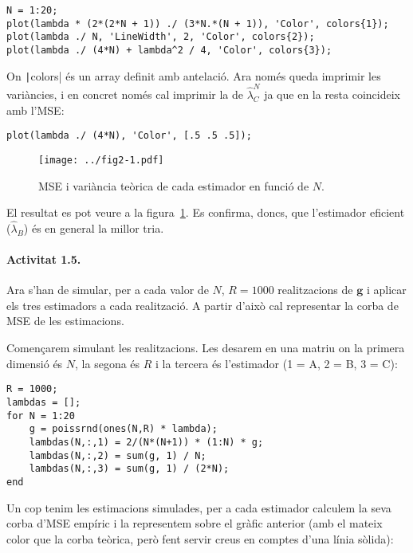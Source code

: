 \documentclass[catalan]{scrartcl}
\begin{document}
\begin{verbatim}
N = 1:20;
plot(lambda * (2*(2*N + 1)) ./ (3*N.*(N + 1)), 'Color', colors{1});
plot(lambda ./ N, 'LineWidth', 2, 'Color', colors{2});
plot(lambda ./ (4*N) + lambda^2 / 4, 'Color', colors{3});
\end{verbatim}

On \texttt|colors| és un array definit amb antelació. Ara només
queda imprimir les variàncies, i en concret només cal imprimir la de $\hat{\lambda}_C^N$
ja que en la resta coincideix amb l'MSE:

\begin{verbatim}
plot(lambda ./ (4*N), 'Color', [.5 .5 .5]);
\end{verbatim}

\begin{figure}
\center
\texttt{[image: ../fig2-1.pdf]}
\caption{MSE i variància teòrica de cada estimador en funció de $N$. \label{fig:fig2-1}}
\end{figure}

El resultat es pot veure a la figura~\ref{fig:fig2-1}. Es confirma, doncs,
que l'estimador eficient ($\hat{\lambda}_B$) és en general la millor tria.

\paragraph{Activitat 1.5.}

Ara s'han de simular, per a cada valor de $N$, $R = 1000$ realitzacions de $\mathbf{g}$
i aplicar els tres estimadors a cada realització. A partir d'això cal representar la corba de MSE de les
estimacions.

Començarem simulant les realitzacions. Les desarem en una matriu on la
primera dimensió és $N$, la segona és $R$ i la tercera és l'estimador (1 = A, 2 = B, 3 = C):

\begin{verbatim}
R = 1000;
lambdas = [];
for N = 1:20
    g = poissrnd(ones(N,R) * lambda);
    lambdas(N,:,1) = 2/(N*(N+1)) * (1:N) * g;
    lambdas(N,:,2) = sum(g, 1) / N;
    lambdas(N,:,3) = sum(g, 1) / (2*N);
end
\end{verbatim}

Un cop tenim les estimacions simulades, per a cada estimador calculem la seva
corba d'MSE empíric i la representem sobre el gràfic anterior (amb el mateix
color que la corba teòrica, però fent servir creus en comptes d'una línia sòlida):
\end{document}
